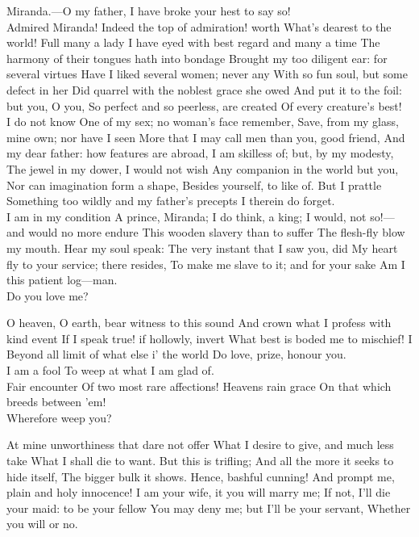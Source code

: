 \documentclass[11pt]{book}
\begin{document}
\2	                  Miranda.---O my father,
	I have broke your hest to say so!  \\

\3	Admired Miranda!
	Indeed the top of admiration! worth
	What's dearest to the world! Full many a lady
	I have eyed with best regard and many a time
	The harmony of their tongues hath into bondage
	Brought my too diligent ear: for several virtues
	Have I liked several women; never any
	With so fun soul, but some defect in her
	Did quarrel with the noblest grace she owed
	And put it to the foil: but you, O you,
	So perfect and so peerless, are created
	Of every creature's best! \\

\2	I do not know
	One of my sex; no woman's face remember,
	Save, from my glass, mine own; nor have I seen
	More that I may call men than you, good friend,
	And my dear father: how features are abroad,
	I am skilless of; but, by my modesty,
	The jewel in my dower, I would not wish
	Any companion in the world but you,
	Nor can imagination form a shape,
	Besides yourself, to like of. But I prattle
	Something too wildly and my father's precepts
	I therein do forget. \\

\3	I am in my condition
	A prince, Miranda; I do think, a king;
	I would, not so!---and would no more endure
	This wooden slavery than to suffer
	The flesh-fly blow my mouth. Hear my soul speak:
	The very instant that I saw you, did
	My heart fly to your service; there resides,
	To make me slave to it; and for your sake
	Am I this patient log---man. \\

\2	Do you love me?

\3	O heaven, O earth, bear witness to this sound
	And crown what I profess with kind event
	If I speak true! if hollowly, invert
	What best is boded me to mischief! I
	Beyond all limit of what else i' the world
	Do love, prize, honour you.  \\

\2	I am a fool
	To weep at what I am glad of.  \\

\1	Fair encounter
	Of two most rare affections! Heavens rain grace
	On that which breeds between 'em! \\

\3	Wherefore weep you?

\2	At mine unworthiness that dare not offer
	What I desire to give, and much less take
	What I shall die to want. But this is trifling;
	And all the more it seeks to hide itself,
	The bigger bulk it shows. Hence, bashful cunning!
	And prompt me, plain and holy innocence!
	I am your wife, it you will marry me;
	If not, I'll die your maid: to be your fellow
	You may deny me; but I'll be your servant,
	Whether you will or no. \\
\end{document}
